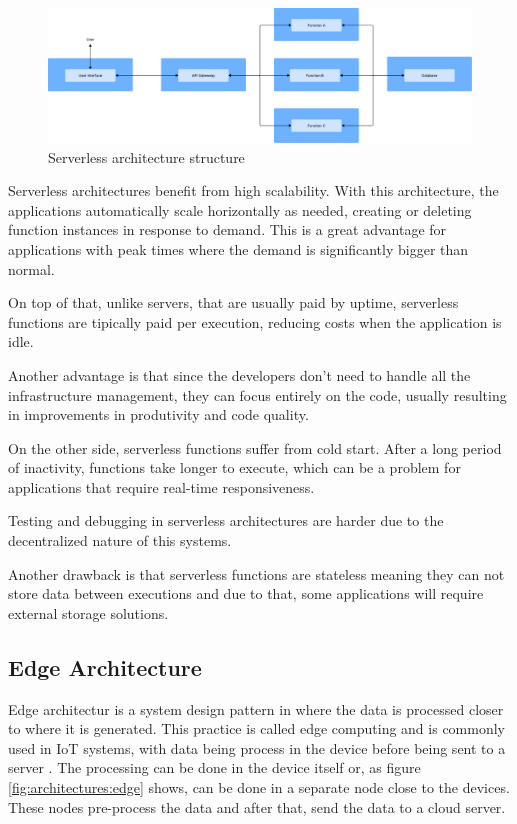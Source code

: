 \begin{figure}[htbp]
	\centering
	\includegraphics[width=\textwidth, height=0.5\textheight, keepaspectratio]{Chapters/Figures/Architectures/Serverless.pdf}
	\caption{Serverless architecture structure}
	\label{fig:architectures:serverless}
\end{figure}

Serverless architectures benefit from high scalability. With this
architecture, the applications automatically scale horizontally as needed, creating or
deleting function instances in response to demand. This is a great
advantage for applications with peak times where the demand is
significantly bigger than normal\cite{GoogleServerless}.

On top of that, unlike servers, that are usually paid by uptime, serverless functions are
tipically paid per execution, reducing costs when the application is idle\cite{s23104868}.

Another advantage is that since the developers don't need to handle all the infrastructure management,
they can focus entirely on the code, usually resulting in improvements in
produtivity and code quality\cite{GoogleServerless}.

On the other side, serverless functions suffer from cold start. After a long
period of inactivity, functions take longer to execute, which
can be a problem for applications that require real-time responsiveness\cite{s21030928}.

Testing and debugging in serverless architectures are harder due to the
decentralized nature of this systems\cite{meghla2023testing}.

Another drawback is that serverless functions are stateless meaning they
can not store data between executions and due to that, some
applications will require external storage solutions\cite{meghla2023testing}.

\subsection{Edge Architecture}
Edge architectur is a system design pattern in where the data is processed
closer to where it is generated. This practice is called edge computing and
is commonly used in \gls{IoT} systems, with data being process in the device
before being sent to a server \cite{s20226441}.
The processing can be done in the device itself or, as figure \ref{fig:architectures:edge}
shows, can be done in a separate node close to the devices. These nodes
pre-process the data and after that, send the data to a cloud server.


